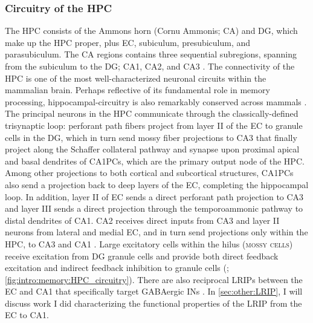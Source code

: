 \subsubsection{Circuitry of the \acl{HPC}}
The \acl{HPC} consists of the Ammons horn (Cornu Ammonis; CA) and \ac{DG}, which make up the \acl{HPC} proper, plus \ac{EC}, subiculum, presubiculum, and parasubiculum.
The CA regions contains three sequential subregions, spanning from the subiculum to the \ac{DG}; CA1, CA2, and CA3 \citep{deNo1934}.
The connectivity of the \ac{HPC} is one of the most well-characterized neuronal circuits within the mammalian brain.
Perhaps reflective of its fundamental role in memory processing, hippocampal-circuitry is also remarkably conserved across mammals \citep{Manns2006}.
The principal neurons in the \ac{HPC} communicate through the classically-defined trisynaptic loop: perforant path fibers project from layer II of the \ac{EC} to granule cells in the \ac{DG}, which in turn send mossy fiber projections to CA3 that finally project along the Schaffer collateral pathway and synapse upon proximal apical and basal dendrites of \acp{CA1PC}, which are the primary output node of the \ac{HPC}.
Among other projections to both cortical and subcortical structures, \acp{CA1PC} also send a projection back to deep layers of the \ac{EC}, completing the hippocampal loop.
In addition, layer II of \ac{EC} sends a direct perforant path projection to CA3 and layer III sends a direct projection through the temporoammonic pathway to distal dendrites of CA1.
CA2 receives direct inputs from CA3 and layer II neurons from lateral and medial \ac{EC}, and in turn send projections only within the \ac{HPC}, to CA3 and CA1 \citep{Hitti2014}. 
Large excitatory cells within the hilus (\textsc{mossy cells}) receive excitation from \ac{DG} granule cells and provide both direct feedback excitation and indirect feedback inhibition to granule cells (\citealp{Danielson2017}; \autoref{fig:intro:memory:HPC_circuitry}).
There are also reciprocal \acp{LRIP} between the \ac{EC} and CA1 that specifically target GABAergic \acp{IN} \citep{Melzer2012, Basu2016}.
In \autoref{sec:other:LRIP}, I will discuss work I did characterizing the functional properties of the \ac{LRIP} from the \ac{EC} to CA1. 
